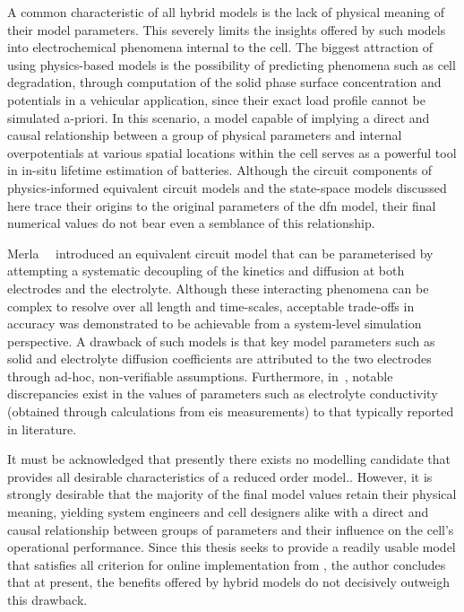 A common characteristic of all hybrid models  is the lack of physical meaning of
their model parameters. This severely limits the insights offered by such models
into electrochemical phenomena  internal to the cell. The  biggest attraction of
using  physics-based models  is  the possibility  of  predicting phenomena  such
as  cell degradation,  \eg{}  through  computation of  the  solid phase  surface
concentration and potentials in a  vehicular application, since their exact load
profile  cannot be  simulated a-priori.  In this  scenario, a  model capable  of
implying a direct and causal relationship between a group of physical parameters
and internal overpotentials at various  spatial locations within the cell serves
as a  powerful tool in  in-situ lifetime  estimation of batteries.  Although the
circuit  components  of  physics-informed  equivalent  circuit  models  and  the
state-space models discussed here trace their origins to the original parameters
of  the  \gls{dfn} model,  their  final  numerical values  do  not  bear even  a
semblance of  this relationship.

Merla~\etal{}~\cite{Merla2018} introduced  an equivalent circuit model  that can
be  parameterised by  attempting a  systematic  decoupling of  the kinetics  and
diffusion at  both electrodes  and the  electrolyte. Although  these interacting
phenomena can be complex to resolve  over all length and time-scales, acceptable
trade-offs in  accuracy was  demonstrated to be  achievable from  a system-level
simulation perspective. A  drawback of such models is that  key model parameters
such  as  solid  and  electrolyte   diffusion  coefficients  are  attributed  to
the  two electrodes  through  ad-hoc,  non-verifiable assumptions.  Furthermore,
in~\cite{Merla2018},  notable discrepancies  exist in  the values  of parameters
such as  electrolyte conductivity (obtained through  calculations from \gls{eis}
measurements) to that typically reported in literature.

It must be acknowledged that presently  there exists no modelling candidate that
provides  all desirable  characteristics of  a reduced  order model.. However,
it is  strongly desirable  that the  majority of the  final model  values retain
their physical meaning, yielding system  engineers and cell designers alike with
a  direct  and  causal  relationship  between groups  of  parameters  and  their
influence  on  the  cell's  operational performance.  Since  this  thesis  seeks
to  provide a  readily  usable  model that  satisfies  all   criterion  for online implementation  from ,  the author
concludes  that  at present,  the  benefits  offered  by  hybrid models  do  not
decisively outweigh this drawback.

